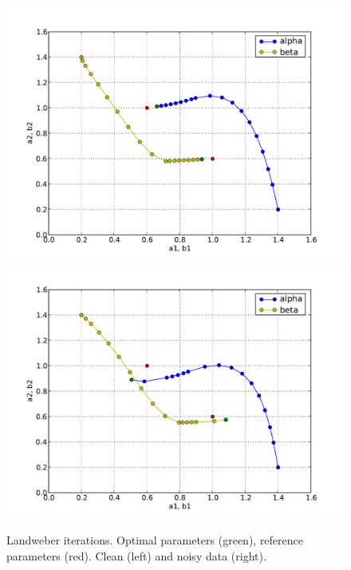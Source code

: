 \begin{figure}
  \centering
  \includegraphics[width=\twofigs]{chapters/schroll/pdf/4Dscan3b.pdf}
  \includegraphics[width=\twofigs]{chapters/schroll/pdf/4Dscan3b-5.pdf}
  \caption{Landweber iterations. Optimal parameters (green), reference
  parameters (red). Clean (left) and noisy data (right).}
  \label{fig4}
\end{figure}

